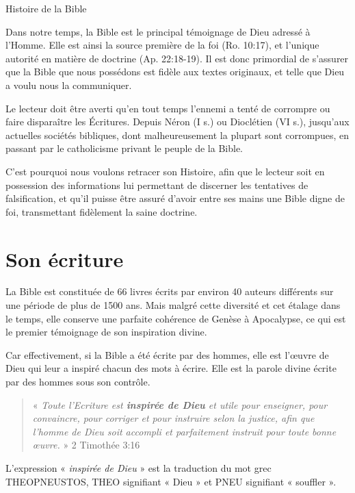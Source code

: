\begin{center}{\LARGE Histoire de la Bible}\end{center}
\begin{small}

Dans notre temps, la Bible est le principal témoignage de Dieu adressé à l'Homme. Elle est ainsi la source première de la foi (Ro. 10:17), et l'unique autorité en matière de doctrine (Ap. 22:18-19). Il est donc primordial de s'assurer que la Bible que nous possédons est fidèle aux textes originaux, et telle que Dieu a voulu nous la communiquer.\bigskip

Le lecteur doit être averti qu'en tout temps l'ennemi a tenté de corrompre ou faire disparaître les Écritures. Depuis Néron (I s.) ou Dioclétien (VI s.), jusqu'aux actuelles sociétés bibliques, dont malheureusement la plupart sont corrompues, en passant par le catholicisme privant le peuple de la Bible.\bigskip

C'est pourquoi nous voulons retracer son Histoire, afin que le lecteur soit en possession des informations lui permettant de discerner les tentatives de falsification, et qu'il puisse être assuré d'avoir entre ses mains une Bible digne de foi, transmettant fidèlement la saine doctrine.

\section*{Son écriture}

La Bible est constituée de 66 livres écrits par environ 40 auteurs différents sur une période de plus de 1500 ans. Mais malgré cette diversité et cet étalage dans le temps, elle conserve une parfaite cohérence de Genèse à Apocalypse, ce qui est le premier témoignage de son inspiration divine.\bigskip

Car effectivement, si la Bible a été écrite par des hommes, elle est l'œuvre de Dieu qui leur a inspiré chacun des mots à écrire. Elle est la parole divine écrite par des hommes sous son contrôle.

\begin{quote}
« \emph{Toute l'Ecriture est \textbf{inspirée de Dieu} et utile pour enseigner, pour convaincre, pour corriger et pour instruire selon la justice, afin que l'homme de Dieu soit accompli et parfaitement instruit pour toute bonne œuvre.} » 2 Timothée 3:16
\end{quote}

L'expression « \emph{inspirée de Dieu} » est la traduction du mot grec THEOPNEUSTOS, THEO signifiant « Dieu » et PNEU signifiant « souffler ».


\end{small}
